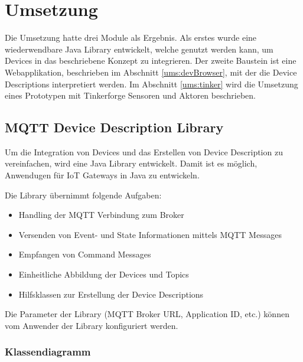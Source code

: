 \chapter{Umsetzung}
\label{chap:umsetzung}

Die Umsetzung hatte drei Module als Ergebnis. Als erstes wurde eine wiederwendbare Java Library entwickelt, welche genutzt werden kann, um Devices in das beschriebene Konzept zu integrieren. Der zweite Baustein ist eine Webapplikation, beschrieben im Abschnitt \ref{ums:devBrowser}, mit der die Device Descriptions interpretiert werden. Im Abschnitt \ref{ums:tinker} wird die Umsetzung eines Prototypen mit Tinkerforge Sensoren und Aktoren beschrieben.

\section{MQTT Device Description Library}
Um die Integration von Devices und das Erstellen von Device Description zu vereinfachen, wird eine Java Library entwickelt. Damit ist es möglich, Anwendugen für IoT Gateways in Java zu entwickeln.

Die Library übernimmt folgende Aufgaben:
\begin{itemize}
\item Handling der MQTT Verbindung zum Broker
\item Versenden von Event- und State Informationen mittels MQTT Messages
\item Empfangen von Command Messages
\item Einheitliche Abbildung der Devices und Topics
\item Hilfsklassen zur Erstellung der Device Descriptions
\end{itemize}

Die Parameter der Library (MQTT Broker URL, Application ID, etc.) können vom Anwender der Library konfiguriert werden.


\subsection{Klassendiagramm}

